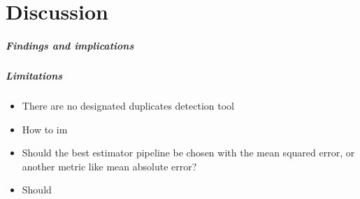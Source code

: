 \chapter{Discussion}
\label{chap:discussion}

\paragraph{Findings and implications}


\paragraph{Limitations}
\begin{itemize}
    \item There are no designated duplicates detection tool
    \item How to im
    \item Should the best estimator pipeline be chosen with the mean squared error, or another metric like mean absolute error?
    \item Should 
\end{itemize}
% 


